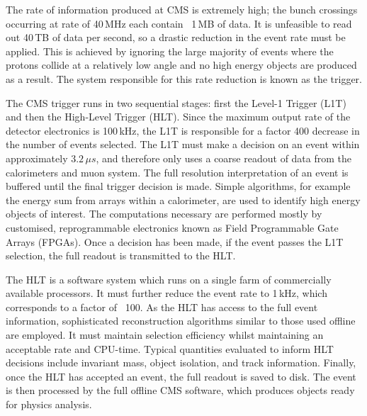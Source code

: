 The rate of information produced at CMS is extremely high; the bunch crossings occurring at rate of 40\,MHz each contain ~1\,MB of data.
It is unfeasible to read out 40\,TB of data per second, so a drastic reduction in the event rate must be applied.
This is achieved by ignoring the large majority of events where the protons collide at a relatively low angle and no high energy objects are produced as a result.
The system responsible for this rate reduction is known as the trigger.

The CMS trigger runs in two sequential stages: first the Level-1 Trigger (L1T) and then the High-Level Trigger (HLT).
Since the maximum output rate of the detector electronics is 100\,kHz, the L1T is responsible for a factor 400 decrease in the number of events selected.
The L1T must make a decision on an event within approximately $3.2\,\mu s$, and therefore only uses a coarse readout of data from the calorimeters and muon system.
The full resolution interpretation of an event is buffered until the final trigger decision is made. %
Simple algorithms, for example the energy sum from arrays within a calorimeter, are used to identify high energy objects of interest.
The computations necessary are performed mostly by customised, reprogrammable electronics known as Field Programmable Gate Arrays (FPGAs).
Once a decision has been made, if the event passes the L1T selection, the full readout is transmitted to the HLT.

The HLT is a software system which runs on a single farm of commercially available processors. %
It must further reduce the event rate to 1\,kHz, which corresponds to a factor of ~100.
As the HLT has access to the full event information, sophisticated reconstruction algorithms similar to those used offline are employed. 
It must maintain selection efficiency whilst maintaining an acceptable rate and CPU-time. 
Typical quantities evaluated to inform HLT decisions include invariant mass, object isolation, and track information.
Finally, once the HLT has accepted an event, the full readout is saved to disk.
The event is then processed by the full offline CMS software, which produces objects ready for physics analysis.
